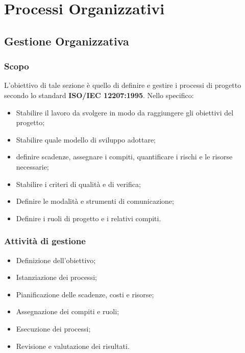 \section{Processi Organizzativi}
    \subsection{Gestione Organizzativa}
        \subsubsection{Scopo}
            L'obiettivo di tale sezione è quello di definire e gestire i processi di progetto secondo lo standard \textbf{ISO/IEC 12207:1995}. Nello specifico:
            \begin{itemize}
                \item Stabilire il lavoro da svolgere in modo da raggiungere gli obiettivi del progetto;
                \item Stabilire quale modello di sviluppo adottare;
                \item definire scadenze, assegnare i compiti, quantificare i rischi e le risorse necessarie;
                \item Stabilire i criteri di qualità e di verifica;
                \item Definire le modalità e strumenti di comunicazione;
                \item Definire i ruoli di progetto e i relativi compiti.
            \end{itemize}

        \subsubsection{Attività di gestione}
            \begin{itemize}
                \item Definizione dell'obiettivo;
                \item Istanziazione dei processi;
                \item Pianificazione delle scadenze, costi e risorse;
                \item Assegnazione dei compiti e ruoli;
                \item Esecuzione dei processi;
                \item Revisione e valutazione dei risultati.
            \end{itemize}

